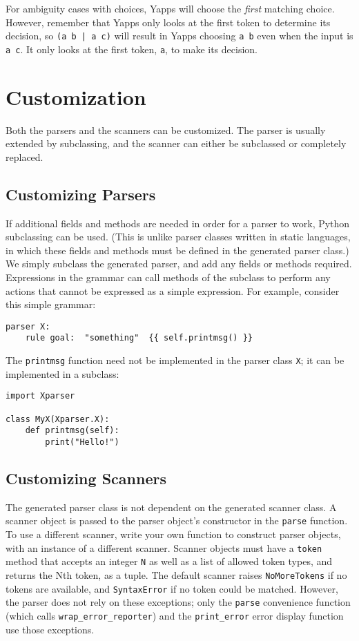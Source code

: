 \documentclass[10pt]{article}
\newcommand{\mysection}[1]{\section{#1}}
\newcommand{\mysubsection}[1]{\subsection{#1}}
\begin{document}
For ambiguity cases with choices, Yapps will choose the \emph{first}
matching choice.  However, remember that Yapps only looks at the first 
token to determine its decision, so {\tt (a b | a c)} will result in
Yapps choosing {\tt a b} even when the input is {\tt a c}.  It only
looks at the first token, {\tt a}, to make its decision.

\mysection{Customization}

Both the parsers and the scanners can be customized.  The parser is
usually extended by subclassing, and the scanner can either be
subclassed or completely replaced.

\mysubsection{Customizing Parsers}

If additional fields and methods are needed in order for a parser to
work, Python subclassing can be used.  (This is unlike parser classes
written in static languages, in which these fields and methods must be
defined in the generated parser class.)  We simply subclass the
generated parser, and add any fields or methods required.  Expressions
in the grammar can call methods of the subclass to perform any actions
that cannot be expressed as a simple expression.  For example,
consider this simple grammar:

\begin{verbatim}
parser X:
    rule goal:  "something"  {{ self.printmsg() }}
\end{verbatim}

The \texttt{printmsg} function need not be implemented in the parser
class \texttt{X}; it can be implemented in a subclass:

\begin{verbatim}
import Xparser

class MyX(Xparser.X):
    def printmsg(self):
        print("Hello!")
\end{verbatim}

\mysubsection{Customizing Scanners}

The generated parser class is not dependent on the generated scanner
class.  A scanner object is passed to the parser object's constructor
in the \texttt{parse} function.  To use a different scanner, write
your own function to construct parser objects, with an instance of a
different scanner.  Scanner objects must have a \texttt{token} method
that accepts an integer \texttt{N} as well as a list of allowed token
types, and returns the Nth token, as a tuple.  The default scanner
raises \texttt{NoMoreTokens} if no tokens are available, and
\texttt{SyntaxError} if no token could be matched.  However, the
parser does not rely on these exceptions; only the \texttt{parse}
convenience function (which calls \texttt{wrap\_error\_reporter}) and
the \texttt{print\_error} error display function use those exceptions.
\end{document}
